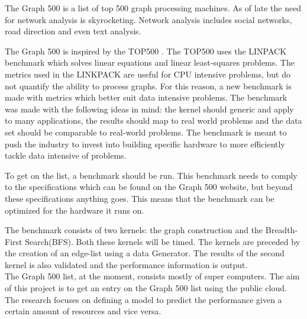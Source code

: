 The Graph 500 \cite{murphy2010introducing} is a list of top 500 graph processing machines. As of late the need for network analysis is skyrocketing. Network analysis includes social networks, road direction and even text analysis. 

The Graph 500 is inspired by the TOP500 \cite{top500}. The TOP500 uses the LINPACK benchmark which solves linear equations and linear least-squares problems. The metrics used in the LINKPACK are useful for CPU intensive problems, but do not quantify the ability to process graphs. For this reason, a new benchmark is made with metrics which better suit data intensive problems. The benchmark was made with the following ideas in mind: the kernel should generic and apply to many applications, the results should map to real world problems and the data set should be comparable to real-world problems. The benchmark is meant to push the industry to invest into building specific hardware to more efficiently tackle data intensive of problems.


To get on the list, a benchmark should be run. This benchmark needs to comply to the specifications which can be found on the Graph 500 website\cite{graph500-specs}, but beyond these specifications anything goes. This means that the benchmark can be optimized for the hardware it runs on. 

The benchmark consists of two kernels: the graph construction and the Breadth-First Search(BFS). Both these kernels will be timed. The kernels are preceded by the creation of an edge-list using a data Generator. The results of the second kernel is also validated and the performance information is output.
\\
The Graph 500 list, at the moment, consists mostly of super computers. The aim of this project is to get an entry on the Graph 500 list using the public cloud. The research focuses on defining a model to predict the performance given a certain amount of resources and vice versa.
